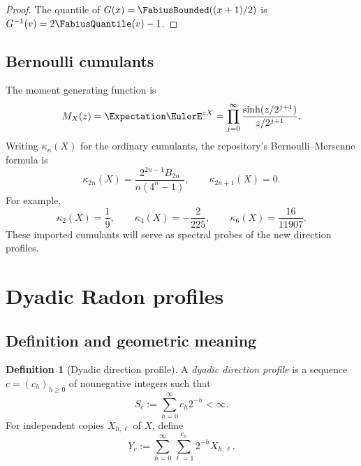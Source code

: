 \documentclass[11pt]{article}
\numberwithin{equation}{section}
\theoremstyle{definition}
\newtheorem{definition}[theorem]{Definition}
\theoremstyle{remark}
\begin{document}
\begin{proof}
The quantile of $G(x)=\FabiusBounded((x+1)/2)$ is
$G^{-1}(v)=2\FabiusQuantile(v)-1$.
\end{proof}

\subsection{Bernoulli cumulants}

The moment generating function is
\begin{equation}
 M_X(z)=\Expectation\EulerE^{zX}
 =\prod_{j=0}^{\infty}
   \frac{\sinh(z/2^{j+1})}{z/2^{j+1}}.
 \label{eq:rank-one-mgf}
\end{equation}
Writing $\kappa_n(X)$ for the ordinary cumulants, the repository's
Bernoulli--Mersenne formula is
\begin{equation}
 \kappa_{2n}(X)
 =\frac{2^{2n-1}B_{2n}}{n(4^n-1)},
 \qquad
 \kappa_{2n+1}(X)=0.
 \label{eq:base-cumulants}
\end{equation}
For example,
\begin{equation}
 \kappa_2(X)=\frac19,
 \qquad
 \kappa_4(X)=-\frac{2}{225},
 \qquad
 \kappa_6(X)=\frac{16}{11907}.
\end{equation}
These imported cumulants will serve as spectral probes of the new direction
profiles.

\section{Dyadic Radon profiles}
\label{sec:profiles}

\subsection{Definition and geometric meaning}

\begin{definition}[Dyadic direction profile]
A \emph{dyadic direction profile} is a sequence
$c=(c_h)_{h\ge0}$ of nonnegative integers such that
\begin{equation}
 S_c:=\sum_{h=0}^{\infty}c_h2^{-h}<\infty.
 \label{eq:support-budget}
\end{equation}
For independent copies $X_{h,\ell}$ of $X$, define
\begin{equation}
 Y_c:=\sum_{h=0}^{\infty}\sum_{\ell=1}^{c_h}2^{-h}X_{h,\ell}.
 \label{eq:Yc}
\end{equation}
\end{definition}
\end{document}
